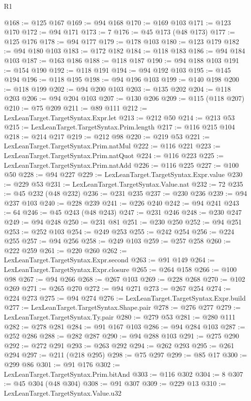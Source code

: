 \begin{lexlean}{R1}
\begin{coremodule}
@168 := @125 @167
@169 := @94 @168
@170 := @169 @103
@171 := @123 @170
@172 := @94 @171
@173 := 7
@176 := @45 @173 (@48 @173)
@177 := @125 @176
@178 := @94 @177
@179 := @178 @103
@180 := @123 @179
@182 := @94 @180 @103
@183 := @172 @182
@184 := @118 @183
@186 := @94 @184 @103
@187 := @163 @186
@188 := @118 @187
@190 := @94 @188 @103
@191 := @154 @190
@192 := @118 @191
@194 := @94 @192 @103
@195 := @145 @194
@196 := @118 @195
@198 := @94 @196 @103
@199 := @140 @198
@200 := @118 @199
@202 := @94 @200 @103
@203 := @135 @202
@204 := @118 @203
@206 := @94 @204 @103
@207 := @130 @206
@209 := @115 (@118 @207)
@210 := @75 @209
@211 := @89 @111
@212 := LexLeanTarget.TargetSyntax.Expr.let
@213 := @212 @50
@214 := @213 @53
@215 := LexLeanTarget.TargetSyntax.Prim.length
@217 := @116 @215 @104
@218 := @214 @217
@219 := @212 @98
@220 := @219 @53
@221 := LexLeanTarget.TargetSyntax.Prim.natMul
@222 := @116 @221
@223 := LexLeanTarget.TargetSyntax.Prim.natQuot
@224 := @116 @223
@225 := LexLeanTarget.TargetSyntax.Prim.natAdd
@226 := @116 @225
@227 := @100 @50
@228 := @94 @227
@229 := LexLeanTarget.TargetSyntax.Expr.value
@230 := @229 @53
@231 := LexLeanTarget.TargetSyntax.Value.nat
@232 := 72
@235 := @45 @232 (@48 @232)
@236 := @231 @235
@237 := @230 @236
@239 := @94 @237 @103
@240 := @228 @239
@241 := @226 @240
@242 := @94 @241
@243 := 64
@246 := @45 @243 (@48 @243)
@247 := @231 @246
@248 := @230 @247
@249 := @94 @248
@250 := @231 @81
@251 := @230 @250
@252 := @94 @251
@253 := @252 @103
@254 := @249 @253
@255 := @242 @254
@256 := @224 @255
@257 := @94 @256
@258 := @249 @103
@259 := @257 @258
@260 := @222 @259
@261 := @220 @260
@262 := LexLeanTarget.TargetSyntax.Expr.second
@263 := @91 @149
@264 := LexLeanTarget.TargetSyntax.Expr.closure
@265 := @264 @158
@266 := @100 @98
@267 := @94 @266
@268 := @267 @103
@269 := @228 @268
@270 := @102 @269
@271 := @265 @270
@272 := @94 @271
@273 := @267 @254
@274 := @224 @273
@275 := @94 @274
@276 := LexLeanTarget.TargetSyntax.Expr.build
@277 := LexLeanTarget.TargetSyntax.Shape.pair
@278 := @276 @277
@279 := LexLeanTarget.TargetSyntax.Ty.pair
@280 := @279 @53
@281 := @280 @111
@282 := @278 @281
@284 := @91 @167 @103
@286 := @94 @284 @103
@287 := @252 @286
@288 := @282 @287
@290 := @94 @288 @103
@291 := @275 @290
@292 := @272 @291
@293 := @263 @292
@294 := @262 @293
@295 := @261 @294
@297 := @211 (@218 @295)
@298 := @75 @297
@299 := @85 @17
@300 := @299 @86
@301 := @91 @176
@302 := LexLeanTarget.TargetSyntax.Prim.bitAnd
@303 := @116 @302
@304 := 8
@307 := @45 @304 (@48 @304)
@308 := @91 @307
@309 := @229 @13
@310 := LexLeanTarget.TargetSyntax.Value.u32

\end{coremodule}
\end{lexlean}
